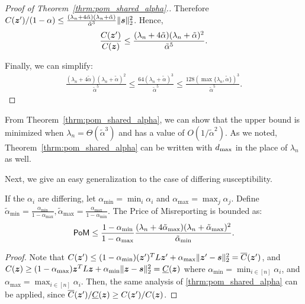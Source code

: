 \begin{proof}[Proof of Theorem~\ref{thrm:pom_shared_alpha}.]
Therefore $C(\bm{z}^\prime) / (1 - \alpha) \le \frac {(\lambda_n + 4 \tilde \alpha) (\lambda_n + \tilde \alpha)} {\tilde \alpha^3} \| \bm{s} \|_2^2$. Hence,
\begin{align}
    \frac {C(\bm{z}^\prime)} {C(\bm{z})} \le \frac {(\lambda_n + 4 \tilde \alpha) (\lambda_n + \tilde \alpha)^2} {\tilde \alpha^5}.
\end{align}

Finally, we can simplify: %
\begin{align}
    \frac {(\lambda_n + 4 \tilde \alpha) (\lambda_n + \tilde \alpha)^2} {\tilde \alpha^5} \le \frac {64 (\lambda_n + \tilde \alpha)^3} {\tilde \alpha^5} \le \frac {128 (\max \{ \lambda_n, \tilde \alpha \})^3} {\tilde \alpha^5}.
\end{align}    
\end{proof}

From Theorem~\ref{thrm:pom_shared_alpha}, we can show that the upper bound is minimized when $\lambda_n = \Theta (\tilde \alpha^3)$ and has a value of $O(1/\tilde \alpha^2)$. As we noted, Theorem~\ref{thrm:pom_shared_alpha} can be written with $d_{\textup{max}}$ in the place of $\lambda_n$ as well. 

Next, we give an easy generalization to the case of differing susceptibility. 
\begin{cor}
If the $\alpha_i$ are differing, let $\alpha_{\min} = \min_i \alpha_i$ and $\alpha_{\max} = \max_j \alpha_j$. Define $\tilde \alpha_{\min} = \frac{\alpha_{\min}}{1 - \alpha_{\max}}, \tilde \alpha_{\max} = \frac{\alpha_{\max}}{1 - \alpha_{\min}}$. The Price of Misreporting is bounded as:
\begin{align*}
        \mathsf{PoM} \le \frac {1 -\alpha_{\min}} {1 - \alpha_{\max}}\frac {(\lambda_n + 4 \tilde \alpha_{\max}) (\lambda_n + \tilde \alpha_{\max})^2} {\tilde \alpha_{\min}}. 
    \end{align*}
\end{cor}
\begin{proof}
Note that $C(\bm{z}^\prime) \le (1 - \alpha_{\min}) (\bm{z}^\prime)^T L \bm{z}^\prime + \alpha_{\max} \| \bm{z}^\prime - \bm{s} \|_2^2 = \overline C(\bm{z}^\prime)$, and $C(\bm{z}) \ge (1 - \alpha_{\max}) \bm{z}^T L \bm{z} + \alpha_{\min} \| \bm{z} - \bm{s} \|_2^2 = \underline C(\bm{z})$ where $\alpha_{\min} = \min_{i \in [n]} \alpha_i$, and $\alpha_{\max} = \max_{i \in [n]} \alpha_i$. Then, the same analysis of \cref{thrm:pom_shared_alpha} can be applied, since $\overline C(\bm{z}^\prime) / \underline C(\bm{z}) \ge C(\bm{z}^\prime) / C(\bm{z})$. 
\end{proof}

